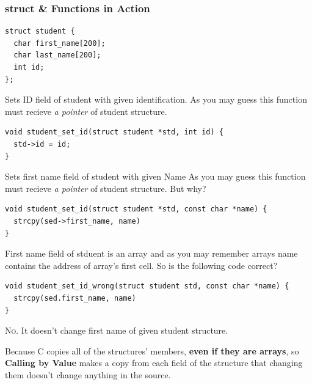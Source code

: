 \documentclass{../c-lecture}
\begin{document}
\begin{frame}[fragile]
  \frametitle{struct \& Functions in Action}
  \begin{verbatim}
struct student {
  char first_name[200];
  char last_name[200];
  int id;
};
  \end{verbatim}
\end{frame}

\begin{frame}[fragile]
  \begin{block}{}
    Sets ID field of student with given identification. As you may guess this
    function must recieve \textit{\color{YellowOrange} a pointer} of student
    structure.
  \end{block}
  \begin{verbatim}
void student_set_id(struct student *std, int id) {
  std->id = id;
}
  \end{verbatim}
\end{frame}

\begin{frame}[fragile]
  \begin{block}{}
      Sets first name field of student with given Name As you may guess this
      function must recieve \textit{\color{YellowOrange} a pointer} of student
      structure. But why?
  \end{block}
  \begin{verbatim}
void student_set_id(struct student *std, const char *name) {
  strcpy(sed->first_name, name)
}
  \end{verbatim}
\end{frame}

\begin{frame}[fragile]
  \begin{block}{}
      First name field of stduent is an array and as you may remember arrays
      name contains the address of array's first cell. So is the following code
      correct? 🤔
  \end{block}
  \begin{verbatim}
void student_set_id_wrong(struct student std, const char *name) {
  strcpy(sed.first_name, name)
}
  \end{verbatim}
  \begin{block}{}
    \textsc{\color{RubineRed} No.} It doesn't change first name of given
    student structure.
  \end{block}
  \begin{block}{}
    Because C copies all of the structures' members,
    \textbf{\color{LimeGreen} even if they are arrays}, so
    \textbf{\color{YellowOrange} Calling by Value} makes a copy from each
    field of the structure that changing them doesn't change anything in the
    source.
  \end{block}
\end{frame}
\end{document}
